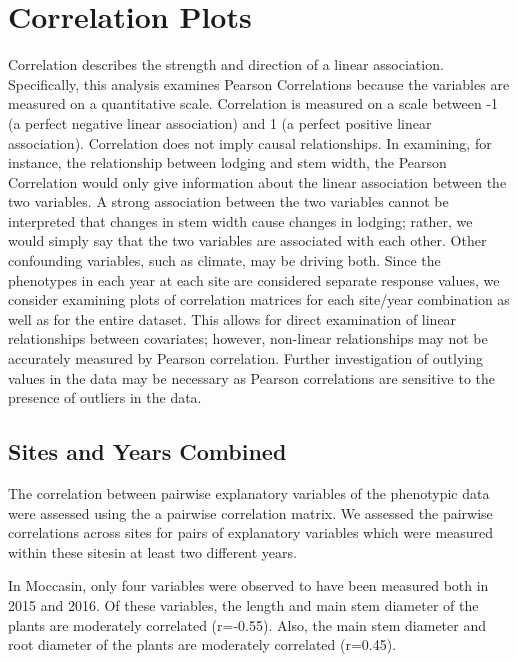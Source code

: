 \documentclass[11pt]{article}
\begin{document}
\section{Correlation Plots}
Correlation describes the strength and direction of a linear association. Specifically, this analysis examines Pearson Correlations because the variables are measured on a quantitative scale.  Correlation is measured on a scale between -1 (a perfect negative linear association) and 1 (a perfect positive linear association). Correlation does not imply causal relationships. In examining, for instance, the relationship between lodging and stem width, the Pearson Correlation would only give information about the linear association between the two variables.  A strong association between the two variables cannot be interpreted that changes in stem width cause changes in lodging; rather, we would simply say that the two variables are associated with each other. Other confounding variables, such as climate, may be driving both. Since the phenotypes in each year at each site are considered separate response values, we consider examining plots of correlation matrices for each site/year combination as well as for the entire dataset. This allows for direct examination of linear relationships between covariates; however, non-linear relationships may not be accurately measured by Pearson correlation. Further investigation of outlying values in the data may be necessary as Pearson correlations are sensitive to the presence of outliers in the data. 

\subsection{Sites and Years Combined}
The correlation between pairwise explanatory variables of the phenotypic data were assessed using the a pairwise correlation matrix. We assessed the pairwise correlations across sites for pairs of explanatory variables which were measured within these sitesin at least two different years.

In Moccasin, only four variables were observed to have been measured both in 2015 and 2016. Of these variables, the length and main stem diameter of the plants are moderately correlated (r=-0.55). Also, the main stem diameter and root diameter of the plants are moderately correlated (r=0.45).
\pagebreak
\end{document}
